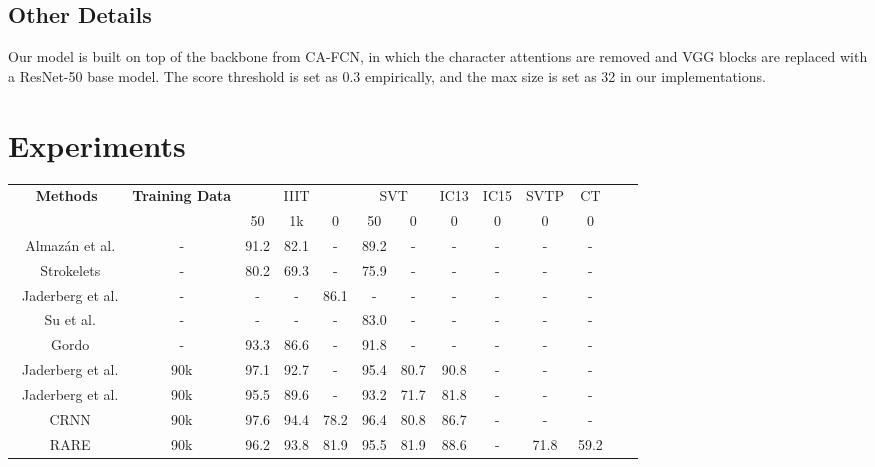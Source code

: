 \documentclass[letterpaper]{article} \usepackage{aaai20}  \usepackage{times}  \usepackage{helvet} \usepackage{courier}  \usepackage[hyphens]{url}  \usepackage{graphicx} \urlstyle{rm} \def\UrlFont{\rm}  \usepackage{graphicx}  \frenchspacing  \setlength{\pdfpagewidth}{8.5in}  \setlength{\pdfpageheight}{11in}
\begin{document}
\subsection{Other Details}

Our model is built on top of the backbone from CA-FCN, in which the character attentions are removed and VGG blocks are replaced with a ResNet-50\cite{resnet} base model. The score threshold  is set as 0.3 empirically, and the max size  is set as 32 in our implementations.


\section{Experiments}

\begin{table*}[t]
    \begin{center}
    \begin{tabular}{|c|c|c|c|c|c|c|c|c|c|c|c|c|}
    \hline
        \multirow{2}{*}{\textbf{Methods}} & \multirow{2}{*}{\textbf{Training Data}} & \multicolumn{3}{|c|}{IIIT} & \multicolumn{2}{|c|}{SVT} & IC13 & IC15 & SVTP & CT \\
        \cline{3-11}
        & & 50 & 1k & 0 & 50 & 0 & 0 & 0 & 0 & 0  \\ \hline
        \hline
        ~Almaz{\'a}n et al.\tiny\cite{almazan2014word} & - & 91.2 & 82.1 & - & 89.2 & - & - & - & - & - \\
        ~Strokelets\tiny\cite{yao2014strokelets} & - & 80.2 & 69.3 & - & 75.9 & - & - & - & - & - \\
        ~Jaderberg et al.\tiny\cite{jaderberg2014deep} & - & - & - & 86.1 & - & - & - & - & - & -\\
        ~Su et al.\tiny\cite{su2014accurate} & - & - & - & - & 83.0 & - & - & - & - & - \\
        ~Gordo\tiny\cite{gordo2015supervised} & - & 93.3 & 86.6 & - & 91.8 & - & - & - & - & - \\
        ~Jaderberg et al.\tiny\cite{jaderberg2016reading} & 90k & 97.1 & 92.7 & - & 95.4 & 80.7 & 90.8 & - & - & - \\
        ~Jaderberg et al.\tiny\cite{jaderberg2014deep} & 90k & 95.5 & 89.6 & - & 93.2 & 71.7 & 81.8 & - & - & - \\
        ~CRNN\tiny\cite{shi2017end} & 90k & 97.6 & 94.4 & 78.2 & 96.4 & 80.8 & 86.7 & - & - & - \\
        ~RARE\tiny\cite{shi2016robust} & 90k & 96.2 & 93.8 & 81.9 & 95.5 & 81.9 & 88.6 & - & 71.8 & 59.2 \\

\end{tabular}
\end{center}
\end{table*}
\end{document}
